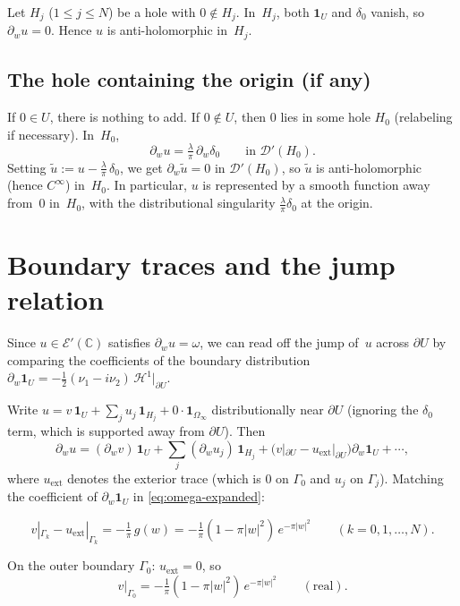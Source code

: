 \documentclass[11pt]{article}
\newcommand{\C}{\mathbb C}
\newcommand{\1}{\mathbf 1}
\newcommand{\pw}{\partial_w}
\begin{document}
Let \(H_j\) (\(1\le j\le N\)) be a hole with \(0\notin H_j\). In~\(H_j\), both
\(\1_U\) and \(\delta_0\) vanish, so
\(\pw u=0\). Hence \(u\) is anti-holomorphic in~\(H_j\).

\subsection{The hole containing the origin (if any)}

If \(0\in U\), there is nothing to add. If \(0\notin U\), then \(0\) lies in some hole
\(H_0\) (relabeling if necessary). In~\(H_0\),
\[
\pw u=\tfrac\lambda\pi\,\pw\delta_0
\qquad\text{in }\mathcal D'(H_0).
\]
Setting \(\tilde u:=u-\frac\lambda\pi\,\delta_0\), we get
\(\pw\tilde u=0\) in \(\mathcal D'(H_0)\), so \(\tilde u\) is anti-holomorphic
(hence \(C^\infty\)) in~\(H_0\). In particular, \(u\) is represented by a smooth
function away from~\(0\) in~\(H_0\), with the distributional singularity
\(\frac\lambda\pi\delta_0\) at the origin.

\section{Boundary traces and the jump relation}\label{sec:boundary}

Since \(u\in\mathcal E'(\C)\) satisfies \(\pw u=\omega\), we can read off the jump
of~\(u\) across \(\partial U\) by comparing the coefficients of the boundary distribution
\(\pw\1_U=-\frac12(\nu_1-i\nu_2)\,\mathcal H^1|_{\partial U}\).

Write \(u=v\,\1_U+\sum_{j}u_j\,\1_{H_j}+0\cdot\1_{\Omega_\infty}\) distributionally
near \(\partial U\) (ignoring the \(\delta_0\) term, which is supported away from
\(\partial U\)). Then
\[
\pw u
=
(\pw v)\,\1_U+\sum_j(\pw u_j)\,\1_{H_j}
+\bigl(v|_{\partial U}-u_{\mathrm{ext}}|_{\partial U}\bigr)\pw\1_U
+\cdots,
\]
where \(u_{\mathrm{ext}}\) denotes the exterior trace (which is \(0\) on \(\Gamma_0\) and
\(u_j\) on \(\Gamma_j\)). Matching the coefficient of \(\pw\1_U\) in
\eqref{eq:omega-expanded}:

\begin{equation}\label{eq:jump}
v|_{\Gamma_k}-u_{\mathrm{ext}}|_{\Gamma_k}
=
-\tfrac1\pi\,g(w)
=
-\tfrac1\pi(1-\pi|w|^2)\,e^{-\pi|w|^2}
\qquad(k=0,1,\dots,N).
\end{equation}

On the outer boundary \(\Gamma_0\): \(u_{\mathrm{ext}}=0\), so
\begin{equation}\label{eq:trace-outer}
v|_{\Gamma_0}=-\tfrac1\pi(1-\pi|w|^2)\,e^{-\pi|w|^2}
\qquad(\text{real}).
\end{equation}
\end{document}
